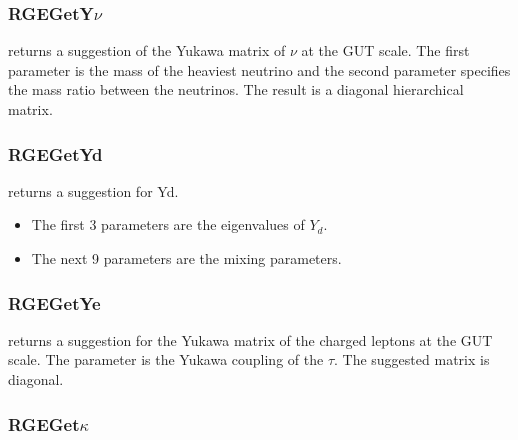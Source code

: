 \documentclass[10pt,a4paper,twoside]{scrartcl}
\begin{document}
\subsubsection{RGEGetY$\nu$}

 returns a suggestion of
the Yukawa matrix of $\nu$ at the GUT scale.  The first parameter is the mass of
the heaviest neutrino and the second parameter specifies the mass ratio between
the neutrinos. The result is a diagonal hierarchical matrix.

\subsubsection{RGEGetYd}

 returns a suggestion for
    Yd.
\begin{itemize}
\item The first 3 parameters are the eigenvalues of $Y_d$.
\item The next 9 parameters are the mixing parameters.
\end{itemize}


\subsubsection{RGEGetYe}

 returns a suggestion for the Yukawa
matrix of the charged leptons at the GUT scale.  The parameter is the Yukawa
coupling of the $\tau$. The suggested matrix is diagonal.

\subsubsection{RGEGet$\kappa$}
\end{document}
